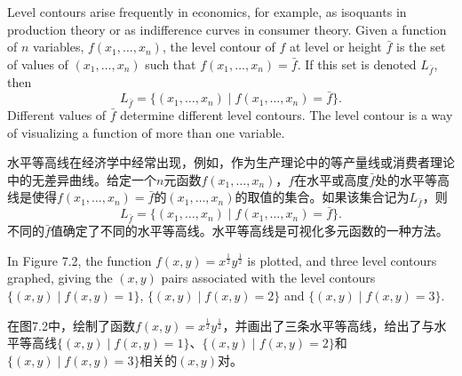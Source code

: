 \begin{original}
Level contours arise frequently in economics, for example, as isoquants in production theory or as indifference curves in consumer theory. Given a function of $n$ variables, $f(x_1, \dots, x_n)$, the level contour of $f$ at level or height $\bar{f}$ is the set of values of $(x_1, \dots, x_n)$ such that $f(x_1, \dots, x_n) = \bar{f}$. If this set is denoted $L_{\bar{f}}$, then
\[
L_{\bar{f}} = \{(x_1, \dots, x_n) \mid f(x_1, \dots, x_n) = \bar{f}\}.
\]
Different values of $\bar{f}$ determine different level contours. The level contour is a way of visualizing a function of more than one variable.
\end{original}
\begin{translation}
水平等高线在经济学中经常出现，例如，作为生产理论中的等产量线或消费者理论中的无差异曲线。给定一个$n$元函数$f(x_1, \dots, x_n)$，$f$在水平或高度$\bar{f}$处的水平等高线是使得$f(x_1, \dots, x_n) = \bar{f}$的$(x_1, \dots, x_n)$的取值的集合。如果该集合记为$L_{\bar{f}}$，则
\[
L_{\bar{f}} = \{(x_1, \dots, x_n) \mid f(x_1, \dots, x_n) = \bar{f}\}.
\]
不同的$\bar{f}$值确定了不同的水平等高线。水平等高线是可视化多元函数的一种方法。
\end{translation}

\begin{original}
In Figure 7.2, the function $f(x, y) = x^{\frac{1}{2}} y^{\frac{1}{2}}$ is plotted, and three level contours graphed, giving the $(x, y)$ pairs associated with the level contours $\{(x, y) \mid f(x, y) = 1\}$, $\{(x, y) \mid f(x, y) = 2\}$ and $\{(x, y) \mid f(x, y) = 3\}$.
\end{original}
\begin{translation}
在图7.2中，绘制了函数$f(x, y) = x^{\frac{1}{2}} y^{\frac{1}{2}}$，并画出了三条水平等高线，给出了与水平等高线$\{(x, y) \mid f(x, y) = 1\}$、$\{(x, y) \mid f(x, y) = 2\}$和$\{(x, y) \mid f(x, y) = 3\}$相关的$(x, y)$对。
\end{translation}

